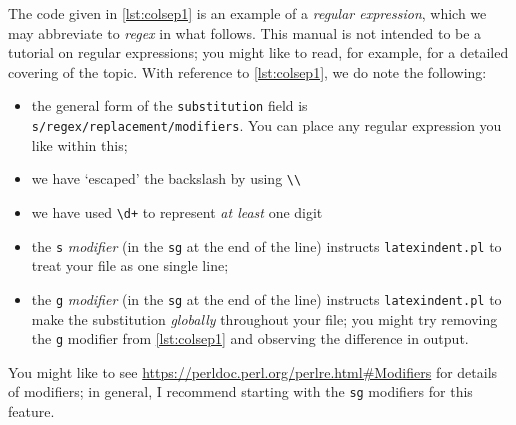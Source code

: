 \documentclass[10pt]{article}
\begin{document}
\begin{example}
 The code given in \cref{lst:colsep1} is an example of a \emph{regular expression}, which
 we may abbreviate to \emph{regex} in what follows. This manual is not intended to be a
 tutorial on regular expressions; you might like to read, for example,
 \cite{masteringregexp} for a detailed covering of the topic. With reference to
 \cref{lst:colsep1}, we do note the following:
 \begin{itemize}
  \item the general form of the \texttt{substitution} field is
        \lstinline!s/regex/replacement/modifiers!. You can place any regular expression
        you like within this;
  \item we have `escaped' the backslash by using \lstinline!\\!
  \item we have used \lstinline!\d+! to represent \emph{at least} one digit
  \item the \texttt{s} \emph{modifier} (in the \texttt{sg} at the end of the line)
        instructs \texttt{latexindent.pl} to treat your file as one single line;
  \item the \texttt{g} \emph{modifier} (in the \texttt{sg} at the end of the line)
        instructs \texttt{latexindent.pl} to make the substitution \emph{globally}
        throughout your file; you might try removing the \texttt{g} modifier from
        \cref{lst:colsep1} and observing the difference in output.
 \end{itemize}
 You might like to see
 \href{https://perldoc.perl.org/perlre.html#Modifiers}{https://perldoc.perl.org/perlre.html\#Modifiers}
 for details of modifiers; in general, I recommend starting with the \texttt{sg}
 modifiers for this feature.
 \end{example}
\end{document}
